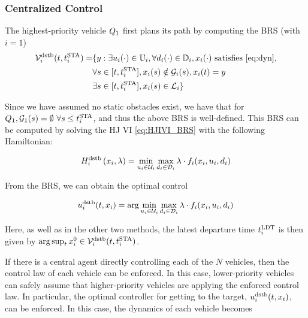 \subsubsection{Centralized Control\label{sec:cc}}
The highest-priority vehicle $Q_1$ first plans its path by computing the BRS (with $i=1$)
\begin{equation}
\label{eq:BRS}
\begin{aligned}
\brs_i^\text{dstb}(t, \sta_i) = & \{y: \exists \ctrl_i(\cdot) \in \cfset_i, \forall \dstb_i(\cdot) \in \dfset_i, \state_i(\cdot) \text{ satisfies \eqref{eq:dyn}},\\
& \forall s \in [t, \sta_i], \state_i(s) \notin \obsset_i(s), \state_i(t) = y\\
& \exists s \in [t, \sta_i], \state_i(s) \in \targetset_i\}
\end{aligned}
\end{equation}

Since we have assumed no static obstacles exist, we have that for $Q_1, \mathcal{G}_1(s)=\emptyset ~ \forall s \le t^\text{STA}_i$, and thus the above BRS is well-defined. This BRS can be computed by solving the HJ VI \eqref{eq:HJIVI_BRS} with the following Hamiltonian:

\begin{equation}
H_i^\text{dstb}\left(x_i, \lambda\right) = \min_{u_i \in \mathcal{U}_i} \max_{d_i \in \mathcal{D}_i} \lambda \cdot f_i(x_i, u_i, d_i)
\end{equation}

From the BRS, we can obtain the optimal control

\begin{equation}
\label{eq:opt_ctrl_i}
\ctrl_i^\text{dstb}(t,\state_i) =  \arg \min_{\ctrl_i \in \cset_i} \max_{\dstb_i \in \dset_i} \costate \cdot \fdyn_i(\state_i, \ctrl_i, \dstb_i)
\end{equation}

Here, as well as in the other two methods, the latest departure time $t^\text{LDT}_i$ is then given by $\arg \sup_t x_{i}^0 \in \mathcal{V}_i^\text{dstb}(t, t^\text{STA}_i)$.

If there is a central agent directly controlling each of the $N$ vehicles, then the control law of each vehicle can be enforced. In this case, lower-priority vehicles can safely assume that higher-priority vehicles are applying the enforced control law. In particular, the optimal controller for getting to the target, $u^\text{dstb}_i(t, x_i)$, can be enforced. In this case, the dynamics of each vehicle becomes 

